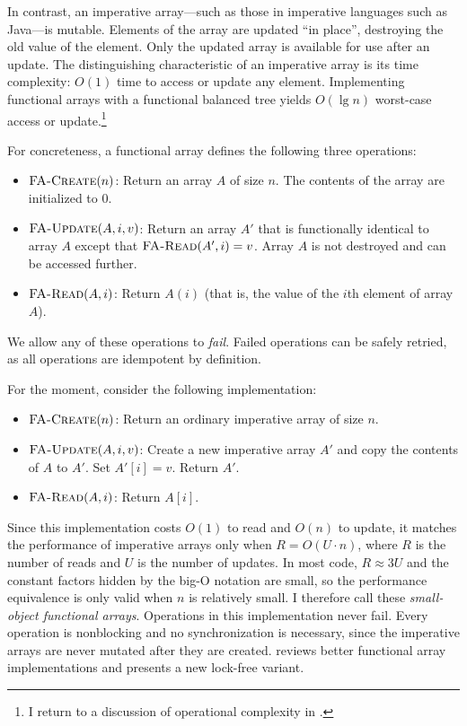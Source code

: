 In contrast, an imperative array---such as those in imperative
languages such as Java---is mutable.  Elements of the array are
updated ``in place'', destroying the old value of the element.  Only
the updated array is available for use after an update.
The distinguishing characteristic of an imperative array is its
time complexity: $O(1)$ time to access or update any element.
Implementing functional arrays with a functional balanced tree yields
$O(\lg n)$ worst-case access or update.\footnote{I return to
a discussion of operational complexity in .}

For concreteness, a functional array defines the following three
operations:
\begin{itemize}
\item $\text{\sc FA-Create}(n)$: Return an array $A$ of size $n$.  The
  contents of the array are initialized to $0$.
\item $\text{\sc FA-Update}(A, i, v)$: Return an array $A'$ that is
  functionally identical to array $A$ except that
  $\text{\sc FA-Read}(A', i)=v$.
  Array $A$ is not destroyed and can be accessed further.
\item $\text{\sc FA-Read}(A, i)$: Return $A(i)$ (that is, the
  value of the $i$th element of array $A$).
\end{itemize}
We allow any of these operations to \emph{fail}.  Failed operations
can be safely retried, as all operations are idempotent by definition.

For the moment, consider the following \naive implementation:
\begin{itemize}
\item $\text{\sc FA-Create}(n)$: Return an ordinary imperative array of size
  $n$.
\item $\text{\sc FA-Update}(A, i, v)$: Create a new imperative array
  $A'$ and copy the contents of $A$ to $A'$.  Set $A'[i]=v$. Return $A'$.
\item $\text{\sc FA-Read}(A, i)$: Return $A[i]$.
\end{itemize}
Since this implementation costs $O(1)$ to read and $O(n)$ to update,
it matches
the performance of imperative arrays only when $R = O(U \cdot n)$,
where $R$ is the number of reads and $U$ is the number of updates.
In most code, $R \approx 3U$ \cite[p. 105]{HennessyPa96} and the
constant factors hidden by the big-O notation are small, so the
performance equivalence is only valid when $n$ is relatively small.  I
therefore call these \emph{small-object functional arrays}.  Operations
in this implementation never fail.  Every operation is nonblocking
and no synchronization is necessary, since the imperative arrays are
never mutated after they are created.   
reviews better functional array implementations and presents
a new lock-free variant.

